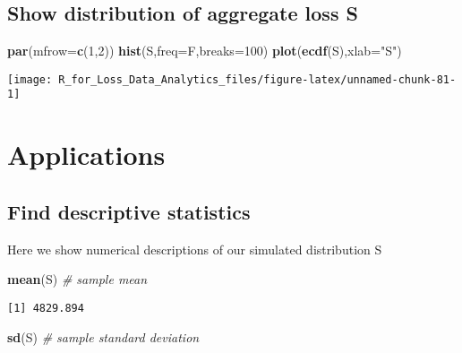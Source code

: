 \documentclass[]{book}
\newenvironment{Shaded}{\begin{snugshade}}{\end{snugshade}}
\newcommand{\KeywordTok}[1]{\textcolor[rgb]{0.13,0.29,0.53}{\textbf{#1}}}
\newcommand{\DataTypeTok}[1]{\textcolor[rgb]{0.13,0.29,0.53}{#1}}
\newcommand{\DecValTok}[1]{\textcolor[rgb]{0.00,0.00,0.81}{#1}}
\newcommand{\StringTok}[1]{\textcolor[rgb]{0.31,0.60,0.02}{#1}}
\newcommand{\CommentTok}[1]{\textcolor[rgb]{0.56,0.35,0.01}{\textit{#1}}}
\newcommand{\NormalTok}[1]{#1}
\theoremstyle{definition}
\theoremstyle{definition}
\theoremstyle{definition}
\theoremstyle{remark}
\begin{document}
\subsection{Show distribution of aggregate loss
S}\label{show-distribution-of-aggregate-loss-s}

\begin{Shaded}
\begin{Highlighting}[]
\KeywordTok{par}\NormalTok{(}\DataTypeTok{mfrow=}\KeywordTok{c}\NormalTok{(}\DecValTok{1}\NormalTok{,}\DecValTok{2}\NormalTok{))}
\KeywordTok{hist}\NormalTok{(S,}\DataTypeTok{freq=}\NormalTok{F,}\DataTypeTok{breaks=}\DecValTok{100}\NormalTok{)}
\KeywordTok{plot}\NormalTok{(}\KeywordTok{ecdf}\NormalTok{(S),}\DataTypeTok{xlab=}\StringTok{"S"}\NormalTok{)}
\end{Highlighting}
\end{Shaded}

\begin{center}\texttt{[image: R\_for\_Loss\_Data\_Analytics\_files/figure-latex/unnamed-chunk-81-1]} \end{center}

\section{Applications}\label{applications}

\subsection{Find descriptive
statistics}\label{find-descriptive-statistics}

Here we show numerical descriptions of our simulated distribution S

\begin{Shaded}
\begin{Highlighting}[]
\KeywordTok{mean}\NormalTok{(S)                             }\CommentTok{# sample mean}
\end{Highlighting}
\end{Shaded}

\begin{verbatim}
[1] 4829.894
\end{verbatim}

\begin{Shaded}
\begin{Highlighting}[]
\KeywordTok{sd}\NormalTok{(S)                               }\CommentTok{# sample standard deviation}
\end{Highlighting}
\end{Shaded}
\end{document}
